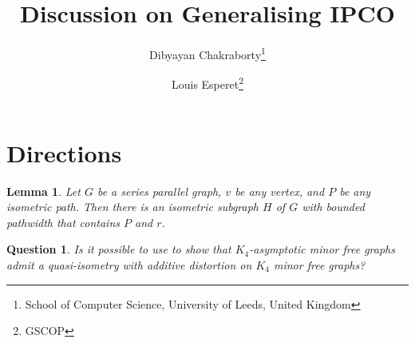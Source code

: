\documentclass[a4paper]{article}
\title{Discussion on Generalising IPCO}
\author{Dibyayan Chakraborty\footnote{School of Computer Science, University of Leeds, United Kingdom}
 \and Louis Esperet\footnote{GSCOP}}
\date{}
\newtheorem{Question}{Question}
\newtheorem{lemma}{Lemma}
\begin{document}
\maketitle

\section{Directions}
 
 
 \begin{lemma}\label{lem:series-parallel}
 	Let $G$ be a series parallel graph, $v$ be any vertex, and $P$ be any isometric path. Then there is an isometric subgraph $H$ of $G$ with bounded pathwidth that contains $P$ and $r$.
 \end{lemma}
 
 \begin{Question}
 	Is it possible to use  to show that $K_4$-asymptotic minor free graphs admit a quasi-isometry with additive distortion on $K_4$ minor free graphs?
 \end{Question}
\end{document}
